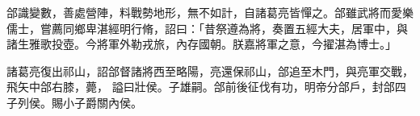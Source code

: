 \begin{pinyinscope}
 
 
 
 郃識變數，善處營陣，料戰勢地形，無不如計，自諸葛亮皆憚之。郃雖武將而愛樂儒士，嘗薦同鄉卑湛經明行脩，詔曰：「昔祭遵為將，奏置五經大夫，居軍中，與諸生雅歌投壺。今將軍外勒戎旅，內存國朝。朕嘉將軍之意，今擢湛為博士。」
 
 
諸葛亮復出祁山，詔郃督諸將西至略陽，亮還保祁山，郃追至木門，與亮軍交戰，飛矢中郃右膝，薨，
 謚曰壯侯。子雄嗣。郃前後征伐有功，明帝分郃戶，封郃四子列侯。賜小子爵關內侯。
 
 
\end{pinyinscope}